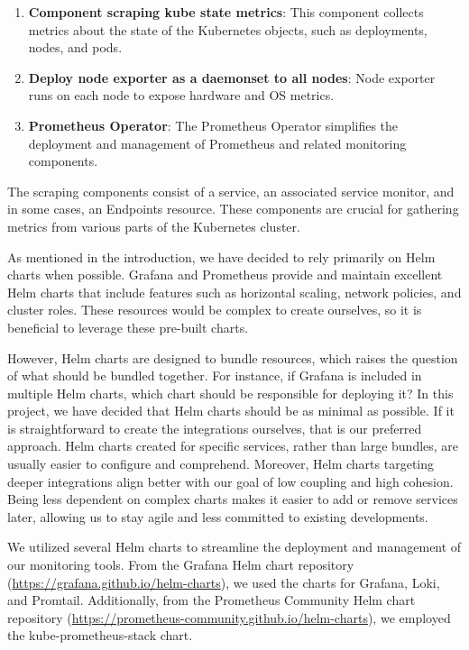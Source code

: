 \begin{enumerate}
    \item \textbf{Component scraping kube state metrics}: This component collects metrics about the state of the Kubernetes objects, such as deployments, nodes, and pods.
    
    \item \textbf{Deploy node exporter as a daemonset to all nodes}: Node exporter runs on each node to expose hardware and OS metrics.
    
    \item \textbf{Prometheus Operator}: The Prometheus Operator simplifies the deployment and management of Prometheus and related monitoring components.
\end{enumerate}

The scraping components consist of a service, an associated service monitor, and in some cases, an Endpoints resource. These components are crucial for gathering metrics from various parts of the Kubernetes cluster.

As mentioned in the introduction, we have decided to rely primarily on Helm charts when possible. Grafana and Prometheus provide and maintain excellent Helm charts that include features such as horizontal scaling, network policies, and cluster roles. These resources would be complex to create ourselves, so it is beneficial to leverage these pre-built charts.

However, Helm charts are designed to bundle resources, which raises the question of what should be bundled together. For instance, if Grafana is included in multiple Helm charts, which chart should be responsible for deploying it? In this project, we have decided that Helm charts should be as minimal as possible. If it is straightforward to create the integrations ourselves, that is our preferred approach. Helm charts created for specific services, rather than large bundles, are usually easier to configure and comprehend. Moreover, Helm charts targeting deeper integrations align better with our goal of low coupling and high cohesion. Being less dependent on complex charts makes it easier to add or remove services later, allowing us to stay agile and less committed to existing developments.

We utilized several Helm charts to streamline the deployment and management of our monitoring tools. From the Grafana Helm chart repository (\url{https://grafana.github.io/helm-charts}), we used the charts for Grafana, Loki, and Promtail. Additionally, from the Prometheus Community Helm chart repository (\url{https://prometheus-community.github.io/helm-charts}), we employed the kube-prometheus-stack chart.

